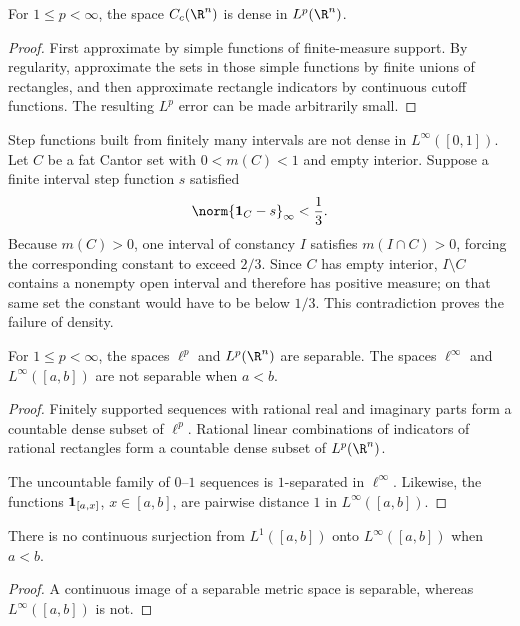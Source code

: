 \begin{thm}
For $1\leq p<\infty$, the space $C_c(\R^n)$ is dense in $L^p(\R^n)$.
\end{thm}

\begin{proof}
First approximate by simple functions of finite-measure support. By regularity, approximate the sets in those simple functions by finite unions of rectangles, and then approximate rectangle indicators by continuous cutoff functions. The resulting $L^p$ error can be made arbitrarily small.
\end{proof}

\begin{remark}
Step functions built from finitely many intervals are not dense in $L^\infty([0,1])$. Let $C$ be a fat Cantor set with $0<m(C)<1$ and empty interior. Suppose a finite interval step function $s$ satisfied
\[
\norm{\1_C-s}_\infty<\frac13.
\]
Because $m(C)>0$, one interval of constancy $I$ satisfies $m(I\cap C)>0$, forcing the corresponding constant to exceed $2/3$. Since $C$ has empty interior, $I\setminus C$ contains a nonempty open interval and therefore has positive measure; on that same set the constant would have to be below $1/3$. This contradiction proves the failure of density.
\end{remark}

\begin{prop}[Separability]
For $1\leq p<\infty$, the spaces $\ell^p$ and $L^p(\R^n)$ are separable. The spaces $\ell^\infty$ and $L^\infty([a,b])$ are not separable when $a<b$.
\end{prop}

\begin{proof}
Finitely supported sequences with rational real and imaginary parts form a countable dense subset of $\ell^p$. Rational linear combinations of indicators of rational rectangles form a countable dense subset of $L^p(\R^n)$.

The uncountable family of $0$--$1$ sequences is $1$-separated in $\ell^\infty$. Likewise, the functions $\mathbf{1}_{[a,x]}$, $x\in[a,b]$, are pairwise distance $1$ in $L^\infty([a,b])$.
\end{proof}

\begin{cor}
There is no continuous surjection from $L^1([a,b])$ onto $L^\infty([a,b])$ when $a<b$.
\end{cor}

\begin{proof}
A continuous image of a separable metric space is separable, whereas $L^\infty([a,b])$ is not.
\end{proof}

